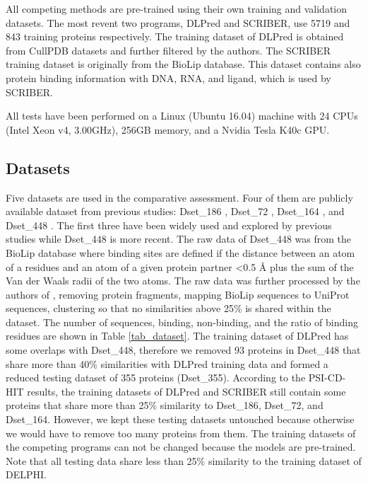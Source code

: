 All competing methods are pre-trained using their own training and validation datasets. The most revent two programs, DLPred and SCRIBER, use 5719 and 843 training proteins respectively. The training dataset of DLPred is obtained from CullPDB datasets \cite{wang2003pisces} and further filtered by the authors. The SCRIBER training dataset is originally from the BioLip database. This dataset contains also protein binding information with DNA, RNA, and ligand, which is used by SCRIBER.

All tests have been performed on a Linux (Ubuntu 16.04) machine with 24 CPUs (Intel Xeon v4, 3.00GHz), 256GB memory, and a Nvidia Tesla K40c GPU.
\subsection{Datasets}
Five datasets are used in the comparative assessment. Four of them are publicly available dataset from previous studies: Dset\_186 \cite{murakami2010applying}, Dset\_72 \cite{hwang2008protein}, Dset\_164 \cite{dhole2014sequence}, and Dset\_448 \cite{zhang2019scriber}. The first three have been widely used and explored by previous studies while Dset\_448 is more recent. The raw data of Dset\_448 was from the BioLip database \cite{yang2012biolip} where binding sites are defined if the distance between an atom of a residues and an atom of a given protein partner <0.5 \AA{} plus the sum of the Van der Waals radii of the two atoms. The raw data was further processed by the authors of \cite{zhang2019scriber}, removing protein fragments, mapping BioLip sequences to UniProt sequences, clustering so that no similarities above 25\% is shared within the dataset. The number of sequences, binding, non-binding, and the ratio of binding residues are shown in Table \ref{tab_dataset}. The training dataset of DLPred has some overlaps with Dset\_448, therefore we removed 93 proteins in Dset\_448 that share more than 40\% similarities with DLPred training data and formed a reduced testing dataset of 355 proteins (Dset\_355).  According to the PSI-CD-HIT results, the training datasets of DLPred and SCRIBER still contain some proteins that share more than 25\% similarity to Dset\_186,  Dset\_72, and Dset\_164. However, we kept these testing datasets untouched because otherwise we would have to remove too many proteins from them. The training datasets of the competing programs can not be changed because the models are pre-trained. Note that all testing data share less than 25\% similarity to the training dataset of DELPHI. 

